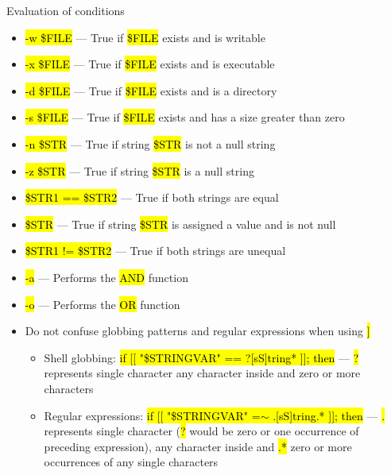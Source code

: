 \documentclass[compress, ucs, xelatex, 11pt, xcolor=svgnames,
  hyperref={
    bookmarks=true,
    unicode=true,
    colorlinks=true,
    pdftitle={Linux, command line and MetaCentrum},
    plainpages=false,
    pdfauthor={Vojtech Zeisek},
    pdfsubject={Course about use of Linux command line, writing shell scripts and using MetaCentrum of CESNET},
    pdfcreator={XeLaTeX},
    pdfkeywords={Linux, GNU, BASH, shell, command line, MetaCentrum},
    linkcolor=DarkRed,
    anchorcolor=DarkBlue,
    citecolor=Indigo,
    filecolor=NavyBlue,
    menucolor=DarkMagenta,
    urlcolor=DarkBlue,
    pdftex},
  url={hyphens, lowtilde} %
  ]{beamer}
\renewcommand{\texttt}[1]{\hl{\ttfamily #1}}
\begin{document}
\begin{frame}[allowframebreaks]{Evaluation of conditions}
\begin{itemize}
    \item \texttt{-w \$FILE} --- True if \texttt{\$FILE} exists and is writable
    \item \texttt{-x \$FILE} --- True if \texttt{\$FILE} exists and is executable
    \item \texttt{-d \$FILE} --- True if \texttt{\$FILE} exists and is a directory
    \item \texttt{-s \$FILE} --- True if \texttt{\$FILE} exists and has a size greater than zero
    \item \texttt{-n \$STR} --- True if string \texttt{\$STR} is not a null string
    \item \texttt{-z \$STR} --- True if string \texttt{\$STR} is a null string
    \item \texttt{\$STR1 == \$STR2} --- True if both strings are equal
    \item \texttt{\$STR} --- True if string \texttt{\$STR} is assigned a value and is not null
    \item \texttt{\$STR1 != \$STR2} --- True if both strings are unequal
    \item \texttt{-a} --- Performs the \texttt{AND} function
    \item \texttt{-o} --- Performs the \texttt{OR} function
    \item Do not confuse globbing patterns and regular expressions when using \texttt{[[ \ldots~]]}
    \begin{itemize}
      \item Shell globbing: \texttt{if [[ "\$STRINGVAR" == ?[sS]tring* ]]; then} --- \texttt{?} represents single character \texttt{[]} any character inside and \texttt{*} zero or more characters
      \item Regular expressions: \texttt{if [[ "\$STRINGVAR" =$\sim$ .[sS]tring.* ]]; then} --- \texttt{.} represents single character (\texttt{?} would be zero or one occurrence of preceding expression), \texttt{[]} any character inside and \texttt{.*} zero or more occurrences of any single characters
    \end{itemize}
  \end{itemize}
\end{frame}
\end{document}
